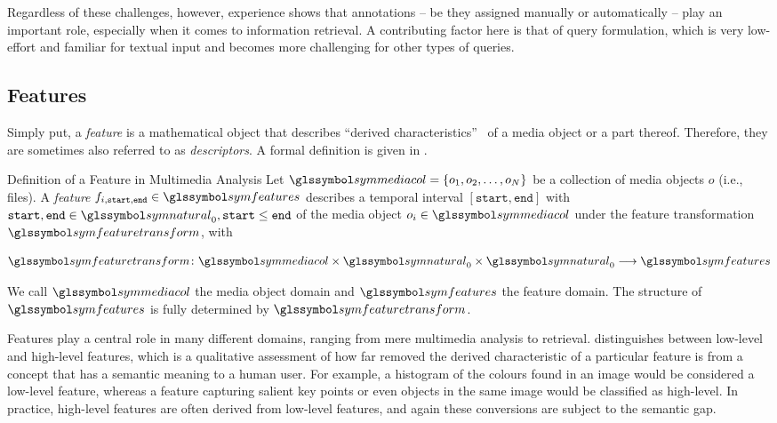 Regardless of these challenges, however, experience shows that annotations -- be they assigned manually or automatically -- play an important role, especially when it comes to information retrieval. A contributing factor here is that of query formulation, which is very low-effort and familiar for textual input and becomes more challenging for other types of queries.

\subsection{Features}
Simply put, a \emph{feature} is a mathematical object that describes ``derived characteristics''~\cite{Blanken:2007multimedia} of a media object or a part thereof. Therefore, they are sometimes also referred to as \emph{descriptors}. A formal definition is given in .

\begin{definition}[label=definition:feature]{Definition of a Feature in Multimedia Analysis}{}
    Let $\symmediacol = \lbrace o_1, o_2, \ldots, o_N \rbrace$ be a collection of media objects $o$ (i.e., files). A \emph{feature} $f_{i,\texttt{start},\texttt{end}} \in \symfeatures$ describes a temporal interval $[ \texttt{start}, \texttt{end} ]$ with $\texttt{start},\texttt{end} \in \symnatural_0, \texttt{start} \leq \texttt{end}$ of the media object $o_i \in \symmediacol$ under the feature transformation $\symfeaturetransform$, with 

    \begin{equation}
        \label{eq:feature_transformation}
        \symfeaturetransform \colon \symmediacol \times \symnatural_0 \times \symnatural_0 \longrightarrow \symfeatures
    \end{equation}

    We call $\symmediacol$ the media object domain and $\symfeatures$ the feature domain. The structure of  $\symfeatures$ is fully determined by $\symfeaturetransform$.
\end{definition}

Features play a central role in many different domains, ranging from mere multimedia analysis to retrieval. \cite{Blanken:2007multimedia} distinguishes between low-level and high-level features, which is a qualitative assessment of how far removed the derived characteristic of a particular feature is from a concept that has a semantic meaning to a human user. For example, a histogram of the colours found in an image would be considered a low-level feature, whereas a feature capturing salient key points or even objects in the same image would be classified as high-level. In practice, high-level features are often derived from low-level features, and again these conversions are subject to the semantic gap.

